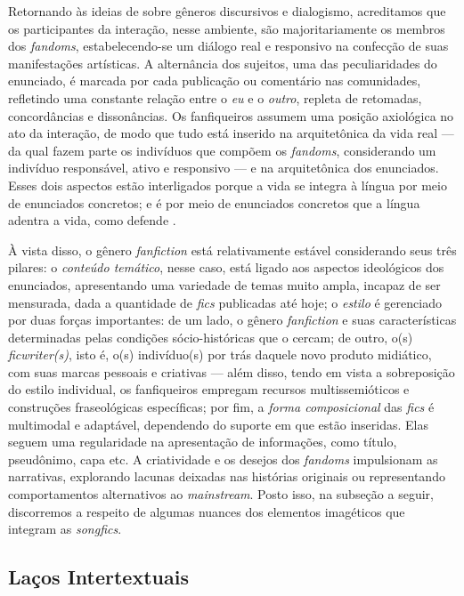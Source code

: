 Retornando às ideias de \textcite{bakhtin2011} sobre gêneros discursivos e
dialogismo, acreditamos que os participantes da interação, nesse
ambiente, são majoritariamente os membros dos \emph{fandoms},
estabelecendo-se um diálogo real e responsivo na confecção de suas
manifestações artísticas. A alternância dos sujeitos, uma das
peculiaridades do enunciado, é marcada por cada publicação ou comentário
nas comunidades, refletindo uma constante relação entre o \emph{eu} e o
\emph{outro}, repleta de retomadas, concordâncias e dissonâncias. Os
fanfiqueiros assumem uma posição axiológica no ato da interação, de modo
que tudo está inserido na arquitetônica da vida real --- da qual fazem
parte os indivíduos que compõem os \emph{fandoms}, considerando um
indivíduo responsável, ativo e responsivo --- e na arquitetônica dos
enunciados. Esses dois aspectos estão interligados porque a vida se
integra à língua por meio de enunciados concretos; e é por meio de
enunciados concretos que a língua adentra a vida, como defende \textcite{bakhtin2011} .

À vista disso, o gênero \emph{fanfiction} está relativamente estável
considerando seus três pilares: o \emph{conteúdo temático}, nesse caso,
está ligado aos aspectos ideológicos dos enunciados, apresentando uma
variedade de temas muito ampla, incapaz de ser mensurada, dada a
quantidade de \emph{fics} publicadas até hoje; o \emph{estilo} é
gerenciado por duas forças importantes: de um lado, o gênero
\emph{fanfiction} e suas características determinadas pelas condições
sócio-históricas que o cercam; de outro, o(s) \emph{ficwriter(s)}, isto
é, o(s) indivíduo(s) por trás daquele novo produto midiático, com suas
marcas pessoais e criativas --- além disso, tendo em vista a
sobreposição do estilo individual, os fanfiqueiros empregam recursos
multissemióticos e construções fraseológicas específicas; por fim, a
\emph{forma composicional} das \emph{fics} é multimodal e adaptável,
dependendo do suporte em que estão inseridas. Elas seguem uma
regularidade na apresentação de informações, como título, pseudônimo,
capa etc. A criatividade e os desejos dos \emph{fandoms} impulsionam as
narrativas, explorando lacunas deixadas nas histórias originais ou
representando comportamentos alternativos ao \emph{mainstream}. Posto
isso, na subseção a seguir, discorremos a respeito de algumas nuances
dos elementos imagéticos que integram as \emph{songfics}.

\subsection{Laços Intertextuais} \label{sub-sec-laços}
  

